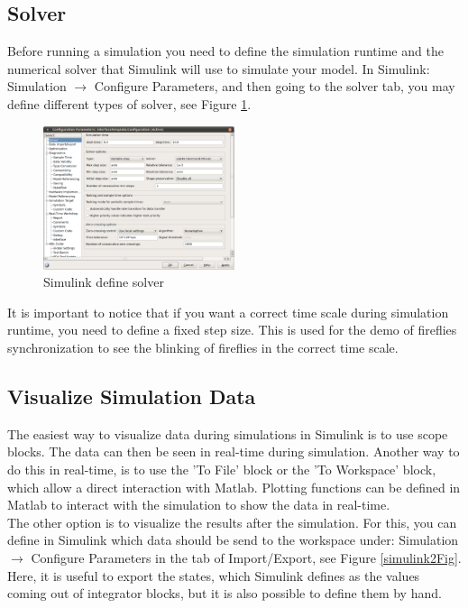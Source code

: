 \documentclass[a4paper,twoside, openright,12pt]{report}
\begin{document}
\subsection{Solver} \label{solver}
Before running a simulation you need to define the simulation runtime and the numerical solver that Simulink will use to simulate your model.
In Simulink: Simulation $\rightarrow$ Configure Parameters, and then going to the solver tab, you may define different types of solver, see Figure \ref{simulink1Fig}.

\begin{figure}[htb]
\centering
\includegraphics[width=0.5\textwidth]{pics/screenSim1.eps}
\caption[Simulink define solver]{Simulink define solver}
\label{simulink1Fig}
\end{figure} 

It is important to notice that if you want a correct time scale during simulation runtime, you need to define a fixed step size. This is used for the demo of fireflies
synchronization to see the blinking of fireflies in the correct time scale.

\subsection{Visualize Simulation Data}

The easiest way to visualize data during simulations in Simulink is to use scope blocks. The data can then be seen in real-time during simulation.
Another way to do this in real-time, is to use the 'To File' block or the 'To Workspace' block, which allow a direct interaction with Matlab. Plotting functions can be defined in Matlab to interact with the simulation
to show the data in real-time.
\\

The other option is to visualize the results after the simulation. For this, you can define in Simulink which data should be send to the workspace under:
Simulation $\rightarrow$ Configure Parameters in the tab of Import/Export, see Figure \ref{simulink2Fig}. Here, it is useful to export the states, which Simulink defines as the 
values coming out of integrator blocks, but it is also possible to define them by hand.
\end{document}
